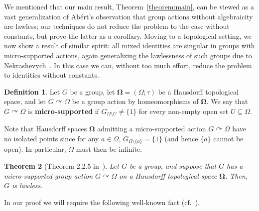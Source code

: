 \documentclass{article}
\newtheorem{theorem}{Theorem}[section]
\theoremstyle{remark}
\theoremstyle{definition}
\newtheorem{definition}[theorem]{Definition}
\def\acts{\curvearrowright}
\DeclareMathOperator{\Homeo}{Homeo}
\newcommand{\spOm}{\bm{\Omega}}
\begin{document}
{We mentioned that our main result, Theorem~\ref{theorem:main}, can be viewed as a vast generalization of Ab\'{e}rt's observation  that  group actions  without algebraicity are lawless; our techniques do not reduce the problem to the case without constants, but prove the latter as a corollary. 
Moving to a topological setting, we now show a result of similar spirit:  all mixed identities are singular in groups with micro-supported actions, again generalizing the lawlessness of such groups due to  Nekrashevych~\cite[Theorem 2.2.5]{nekrashevych2022groups}. In this case we can, without too much effort, reduce the problem to identities without constants.


\begin{definition}\label{def:microsupported}
   Let $G$ be a group, let $\spOm=(\Omega;\tau)$ be a Hausdorff topological space,  and let $G\acts \Omega$ be a group action  by homeomorphisms of $\spOm$. %
We say that $G\acts \Omega$ is \textbf{micro-supported} if $G_{\Omega\setminus U}\neq\{1\}$
for every non-empty open set $U\subseteq \Omega$.
\end{definition}

Note that Hausdorff spaces $\spOm$  admitting a micro-supported action $G\acts \Omega$ have  no isolated points since for any  $a\in \Omega$, $G_{\Omega\setminus\{a\}}=\{1\}$ (and hence $\{a\}$ cannot be open). In particular, $\Omega$ %
must then be  infinite.

\begin{theorem}[Theorem 2.2.5 in~\cite{nekrashevych2022groups}]\label{thm:microlawless}
    Let $G$ be a group, and suppose that $G$ has a micro-supported  group action $G\acts \Omega$ on a  Hausdorff topological space
    $\spOm$. Then, $G$ is lawless. 
\end{theorem}

In our proof we will require the following well-known fact (cf.~\cite[Corollary 2.2.6]{nekrashevych2022groups}). 

}
\end{document}
